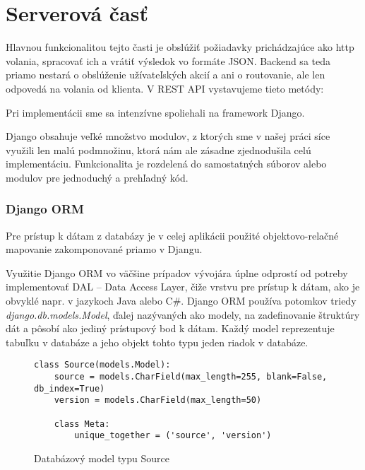 \chapter{Serverová časť}
Hlavnou funkcionalitou tejto časti je obslúžiť požiadavky prichádzajúce ako http volania, spracovať ich a vrátiť výsledok vo formáte JSON. Backend sa teda priamo nestará o obslúženie užívateľských akcií a ani o routovanie, ale len odpovedá na volania od klienta. V REST API vystavujeme tieto metódy:

 \begin{minipage}{0.9\linewidth}
 	\centering
 \end{minipage}
 

Pri implementácii sme sa intenzívne spoliehali na framework Django.
\par Django obsahuje veľké množstvo modulov, z ktorých sme v našej práci síce využili len malú podmnožinu, ktorá nám ale zásadne zjednodušila celú implementáciu. Funkcionalita je rozdelená do samostatných súborov alebo modulov pre jednoduchý a prehľadný kód.

\subsection{Django ORM}
Pre prístup k dátam z databázy je v celej aplikácii použité objektovo-relačné mapovanie zakomponované priamo v Djangu.
\par Využitie Django ORM vo väčšine prípadov vývojára úplne odprostí od potreby implementovať DAL -- Data Access Layer, čiže vrstvu pre prístup k dátam, ako je obvyklé napr. v jazykoch Java alebo C\#. Django ORM používa potomkov triedy \emph{django.db.models.Model}, ďalej nazývaných ako modely, na zadefinovanie štruktúry dát a pôsobí ako jediný prístupový bod k dátam. Každý model reprezentuje tabuľku v databáze a jeho objekt tohto typu jeden riadok v databáze. 

\begin{figure}[htbp]
\centering
\begin{minipage}{0.9\textwidth}
\lstset{tabsize=4,columns=flexible,breaklines=true,breakatwhitespace=true, showstringspaces=false}
\begin{lstlisting}
class Source(models.Model):
    source = models.CharField(max_length=255, blank=False, db_index=True)
    version = models.CharField(max_length=50)

    class Meta:
        unique_together = ('source', 'version')
\end{lstlisting} 		
\end{minipage} 
\caption{Databázový model typu Source}
\label{fig:static-analysis}
\end{figure}


